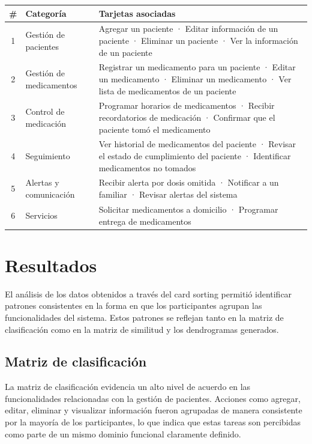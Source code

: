 \documentclass[11pt]{article}
\begin{document}
\begin{center}
\small
\begin{tabular}{clp{11cm}}
  \toprule
  \textbf{\color{uniblue}\#} &
  \textbf{\color{uniblue}Categoría} &
  \textbf{\color{uniblue}Tarjetas asociadas} \\
  \midrule
  1 & Gestión de pacientes &
    Agregar un paciente · Editar información de un paciente ·
    Eliminar un paciente · Ver la información de un paciente \\[4pt]
  2 & Gestión de medicamentos &
    Registrar un medicamento para un paciente · Editar un medicamento ·
    Eliminar un medicamento · Ver lista de medicamentos de un paciente \\[4pt]
  3 & Control de medicación &
    Programar horarios de medicamentos · Recibir recordatorios de
    medicación · Confirmar que el paciente tomó el medicamento \\[4pt]
  4 & Seguimiento &
    Ver historial de medicamentos del paciente · Revisar el estado de
    cumplimiento del paciente · Identificar medicamentos no tomados \\[4pt]
  5 & Alertas y comunicación &
    Recibir alerta por dosis omitida · Notificar a un familiar ·
    Revisar alertas del sistema \\[4pt]
  6 & Servicios &
    Solicitar medicamentos a domicilio · Programar entrega de
    medicamentos \\
  \bottomrule
\end{tabular}
\end{center}



\section{Resultados}

El análisis de los datos obtenidos a través del card sorting permitió identificar patrones consistentes en la forma en que los participantes agrupan las funcionalidades del sistema. Estos patrones se reflejan tanto en la matriz de clasificación como en la matriz de similitud y los dendrogramas generados.

\subsection{Matriz de clasificación}
La matriz de clasificación evidencia un alto nivel de acuerdo en las funcionalidades relacionadas con la gestión de pacientes. Acciones como agregar, editar, eliminar y visualizar información fueron agrupadas de manera consistente por la mayoría de los participantes, lo que indica que estas tareas son percibidas como parte de un mismo dominio funcional claramente definido.
\end{document}
